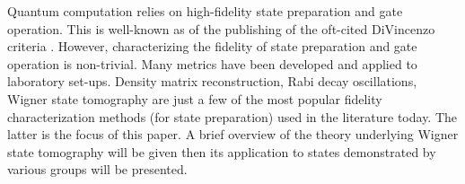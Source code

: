 Quantum computation relies on high-fidelity state preparation and gate operation. This is well-known as of the publishing of the oft-cited DiVincenzo criteria \cite{DIV2000}. However, characterizing the fidelity of state preparation and gate operation is non-trivial. Many metrics have been developed and applied to laboratory set-ups. Density matrix reconstruction, Rabi decay oscillations, Wigner state tomography are just a few of the most popular fidelity characterization methods (for state preparation) used in the literature today. The latter is the focus of this paper. A brief overview of the theory underlying Wigner state tomography will be given then its application to states demonstrated by various groups will be presented.

